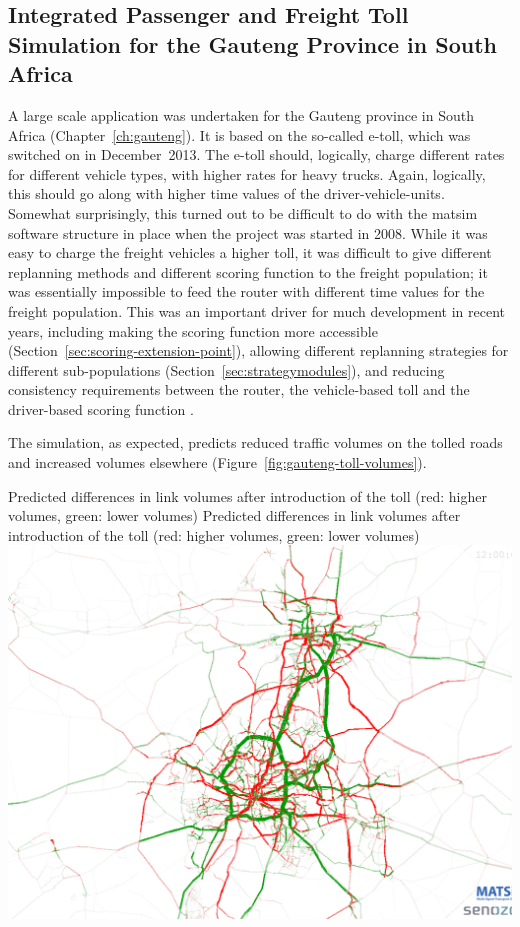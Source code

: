 \subsection{Integrated Passenger and Freight Toll Simulation for the Gauteng Province in South Africa}
A large scale application was undertaken for the Gauteng province in South Africa (Chapter~\ref{ch:gauteng}). It is based on the so-called e-toll, which was switched on in December~2013. The e-toll should, logically, charge different rates for different vehicle types, with higher rates for heavy trucks. Again, logically, this should go along with higher time values of the driver-vehicle-units.  Somewhat surprisingly, this turned out to be difficult to do with the \gls{matsim} software structure in place when the project was started in 2008. While it was easy to charge the freight vehicles a higher toll, it was difficult to give different replanning methods and different scoring function to the freight population; it was essentially impossible to feed the router with different time values for the freight population. This was an important driver for much development in recent years, including making the scoring function more accessible (Section~\ref{sec:scoring-extension-point}), allowing different replanning strategies for different sub-populations (Section~\ref{sec:strategymodules}), and reducing consistency requirements between the router, the vehicle-based toll and the driver-based scoring function \citep{NagelKickhoeferJoubert2014HeterogeneousVoTsPROCEDIA}.

The simulation, as expected, predicts reduced traffic volumes on the tolled roads and increased volumes elsewhere (Figure~\ref{fig:gauteng-toll-volumes}).

\createfigure%
{ Predicted differences in link volumes after introduction of the toll (red: higher volumes, green: lower volumes)}%
{ Predicted differences in link volumes after introduction of the toll (red: higher volumes, green: lower volumes)}%
{\label{fig:gauteng-toll-volumes}}%
{\includegraphics[width=0.8\hsize,trim=0 0 0 0,clip]{extending/figures/roadpricing/abs-diff-link-vol-vot55-24h.png}}%
{}


